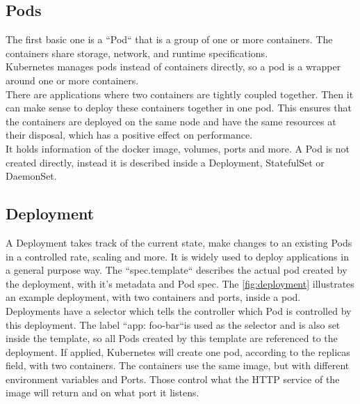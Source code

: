 \subsection{Pods}
The first basic one is a ``Pod`` that is a group of one or more containers.
The containers share storage, network, and runtime specifications.
\\
Kubernetes manages pods instead of containers directly, so a pod is a wrapper around one or more containers.
\\
There are applications where two containers are tightly coupled together.
Then it can make sense to deploy these containers together in one pod.
This ensures that the containers are deployed on the same node and have the same resources at their disposal, which has a positive effect on performance.
\\
It holds information of the docker image, volumes, ports and more.
A Pod is not created directly, instead it is described inside a Deployment, StatefulSet or DaemonSet.

\subsection{Deployment}

A Deployment takes track of the current state, make changes to an existing Pods in a controlled rate, scaling and more.
It is widely used to deploy applications in a general purpose way.
The ``spec.template`` describes the actual pod created by the deployment, with it's metadata and Pod spec.
The \autoref{fig:deployment} illustrates an example deployment, with two containers and ports, inside a pod.
Deployments have a selector which tells the controller which Pod is controlled by this deployment.
The label ``app: foo-bar``is used as the selector and is also set inside the template, so all Pods created by this template are referenced to the deployment.
If applied, Kubernetes will create one pod, according to the replicas field, with two containers.
The containers use the same image, but with different environment variables and Ports.
Those control what the HTTP service of the image will return and on what port it listens.

